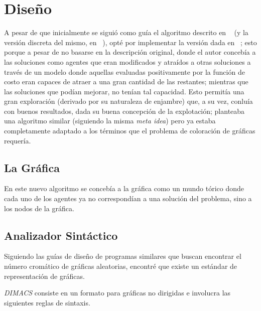 \documentclass[a4paper]{report}
\begin{document}
\chapter{Dise\~no}
A pesar de que inicialmente se sigui\'o como gu\'ia el algoritmo descrito en
~\cite{gsa} (y la versi\'on discreta del mismo, en ~\cite{bgsa}), opt\'e por
implementar la versi\'on dada en ~\cite{israel}; esto porque a pesar de
no basarse en la descripci\'on original, donde el autor conceb\'ia a las soluciones
como agentes que eran modificados y atra\'idos a otras soluciones a trav\'es
de un modelo donde aquellas evaluadas positivamente por la funci\'on de costo
eran capaces de atraer a una gran cantidad de las restantes; mientras que
las soluciones que pod\'ian mejorar, no ten\'ian tal capacidad. Esto permit\'ia
una gran exploraci\'on (derivado por su naturaleza de enjambre) que, a su vez,
conlu\'ia con buenos resultados, dada su buena concepci\'on de la explotaci\'on;
planteaba una algoritmo similar (siguiendo la misma \textit{meta idea}) pero
ya estaba completamente adaptado a los t\'erminos que el problema de coloraci\'on
de gr\'aficas requer\'ia.

\section{La Gr\'afica}

En este nuevo algoritmo se conceb\'ia a la gr\'afica como un mundo t\'orico donde
cada uno de los agentes ya no correspond\'ian a una soluci\'on del problema, sino
a los nodos de la gr\'afica.

\section{Analizador Sint\'actico}
Siguiendo las gu\'ias de dise\~no de programas similares que buscan encontrar el
n\'umero crom\'atico de gr\'aficas aleatorias, encontr\'e que existe un est\'andar
de representaci\'on de gr\'aficas.

\textit{DIMACS} consiste en un formato para gr\'aficas no dirigidas e involucra
las siguientes reglas de sintaxis.
\end{document}
